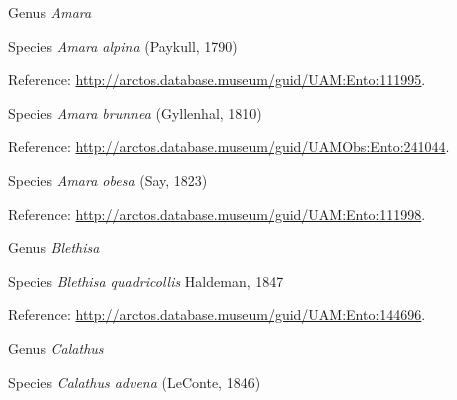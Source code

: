 \documentclass[9pt, article]{memoir}
\begin{document}
\begin{multicols}{2}
\vspace{6pt}\noindent\hspace{30pt}Genus \textit{Amara}


\vspace{6pt}\noindent\hspace{36pt}Species \textit{Amara alpina} (Paykull, 1790)


\vspace{6pt}Reference: 
\url{http://arctos.database.museum/guid/UAM:Ento:111995}.

\vspace{6pt}\noindent\hspace{36pt}Species \textit{Amara brunnea} (Gyllenhal, 1810)


\vspace{6pt}Reference: 
\url{http://arctos.database.museum/guid/UAMObs:Ento:241044}.

\vspace{6pt}\noindent\hspace{36pt}Species \textit{Amara obesa} (Say, 1823)


\vspace{6pt}Reference: 
\url{http://arctos.database.museum/guid/UAM:Ento:111998}.

\vspace{6pt}\noindent\hspace{30pt}Genus \textit{Blethisa}


\vspace{6pt}\noindent\hspace{36pt}Species \textit{Blethisa quadricollis} Haldeman, 1847


\vspace{6pt}Reference: 
\url{http://arctos.database.museum/guid/UAM:Ento:144696}.

\vspace{6pt}\noindent\hspace{30pt}Genus \textit{Calathus}


\vspace{6pt}\noindent\hspace{36pt}Species \textit{Calathus advena} (LeConte, 1846)



\end{multicols}
\end{document}
